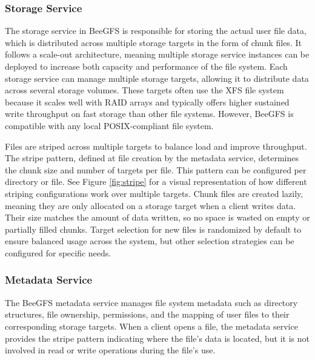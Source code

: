 \subsubsection{Storage Service}

\vspace{-1.2em}

The storage service in BeeGFS is responsible for storing the actual user file data, which is distributed across multiple storage targets in the form of chunk files. It follows a scale-out architecture, meaning multiple storage service instances can be deployed to increase both capacity and performance of the file system. Each storage service can manage multiple storage targets, allowing it to distribute data across several storage volumes. These targets often use the XFS file system because it scales well with RAID arrays and typically offers higher sustained write throughput on fast storage than other file systems. However, BeeGFS is compatible with any local POSIX-compliant file system.

Files are striped across multiple targets to balance load and improve throughput. The stripe pattern, defined at file creation by the metadata service, determines the chunk size and number of targets per file. This pattern can be configured per directory or file. See Figure \ref{fig:stripe} for a visual representation of how different striping configurations work over multiple targets. Chunk files are created lazily, meaning they are only allocated on a storage target when a client writes data. Their size matches the amount of data written, so no space is wasted on empty or partially filled chunks. Target selection for new files is randomized by default to ensure balanced usage across the system, but other selection strategies can be configured for specific needs.


\subsubsection{Metadata Service}

\vspace{-1.2em}

The BeeGFS metadata service manages file system metadata such as directory structures, file ownership, permissions, and the mapping of user files to their corresponding storage targets. When a client opens a file, the metadata service provides the stripe pattern indicating where the file's data is located, but it is not involved in read or write operations during the file’s use.

